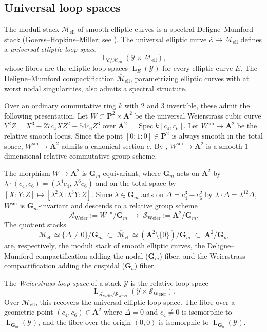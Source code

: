 \documentclass[12pt, oneside]{amsart}
\numberwithin{equation}{section}
\theoremstyle{remark}
\theoremstyle{plain}
\newcommand{\Loop}{\operatorname{L}}
\newcommand{\YY}{\mathcal{Y}}
\DeclareMathOperator{\spc}{Spec}
\newcommand{\GGa}{\mathbf{G}_{a}}
\newcommand{\GGm}{\mathbf{G}_{m}}
\newcommand{\Mell}{\mathcal{M}_{\mathrm{ell}}}
\begin{document}
\subsection{Universal loop spaces}
\label{ssec:Weierstrass}

The moduli stack $\Mell$ of smooth elliptic curves is a spectral Deligne--Mumford stack (Goerss--Hopkins--Miller; see \cite{LurieEllSurv}).
The universal elliptic curve $\mathcal{E} \to \Mell$ defines a \emph{universal elliptic loop space}
$$ \Loop_{\mathcal{E}/\Mell}(\YY \times \Mell), $$
whose fibres are the elliptic loop spaces $\Loop_{E}(\YY)$ for every elliptic curve $E$.
The Deligne--Mumford compactification $\overline{\mathcal{M}}_{\mathrm{ell}}$, parametrizing elliptic curves with at worst nodal singularities, also admits a spectral structure.

Over an ordinary commutative ring $k$ with $2$ and $3$ invertible, these admit the following presentation.
Let $W \subset \mathbf{P}^2 \times \mathbf{A}^2$ be the universal Weierstrass cubic curve $Y^2Z = X^3 - 27 c_4 X Z^2 - 54 c_6 Z^3$ over $\mathbf{A}^2 = \spc k[c_4, c_6]$.
Let $W^{\mathrm{sm}} \to \mathbf{A}^2$ be the relative smooth locus.
Since the point $[0:1:0] \in \mathbf{P}^2$ is always smooth in the total space, $W^{\mathrm{sm}} \to \mathbf{A}^2$ admits a canonical section $e$.
By \cite[II, Prop.~2.7]{DeligneRapoport}, $W^{\mathrm{sm}} \to \mathbf{A}^2$ is a smooth $1$-dimensional relative commutative group scheme.

The morphism $W \to \mathbf{A}^2$ is $\GGm$-equivariant, where $\GGm$ acts on $\mathbf{A}^2$ by $\lambda \cdot (c_4, c_6) = (\lambda^4 c_4,\, \lambda^6 c_6)$ and on the total space by $[X:Y:Z]\mapsto[\lambda^{2}X:\lambda^{3}Y:Z]$.
Since $\lambda \in \GGm$ acts on $\Delta = c_4^3 - c_6^2$ by $\lambda \cdot \Delta = \lambda^{12}\Delta$, $W^{\mathrm{sm}}$ is $\GGm$-invariant and descends to a relative group scheme
\[ \mathcal{A}_{\mathrm{Weier}} := W^{\mathrm{sm}}/\GGm \;\longrightarrow\; \mathcal{S}_{\mathrm{Weier}} := \mathbf{A}^2/\GGm. \]
The quotient stacks
\[
  \Mell \simeq \{\Delta\neq 0\}/\GGm
  \;\subset\;
  \overline{\mathcal{M}}_{\mathrm{ell}} \simeq (\mathbf{A}^2 \setminus \{0\})/\GGm
  \;\subset\;
  \mathbf{A}^2/\GGm
\]
are, respectively, the moduli stack of smooth elliptic curves, the Deligne--Mumford compactification adding the nodal ($\GGm$) fiber, and the Weierstrass compactification adding the cuspidal ($\GGa$) fiber.

The \emph{Weierstrass loop space} of a stack $\YY$ is the relative loop space
$$\Loop_{\mathcal{A}_{\mathrm{Weier}}/\mathcal{S}_{\mathrm{Weier}}}(\YY \times \mathcal{S}_{\mathrm{Weier}}).$$
Over $\Mell$, this recovers the universal elliptic loop space.
The fibre over a geometric point $(c_4, c_6) \in \mathbf{A}^2$ where $\Delta=0$ and $c_4 \neq 0$ is isomorphic to $\Loop_{\GGm}(\YY)$, and the fibre over the origin $(0,0)$ is isomorphic to $\Loop_{\GGa}(\YY)$.
\end{document}
